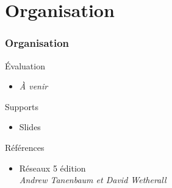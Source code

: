 \section{Organisation}

\begin{frame}[fragile]
  \frametitle{Organisation}
Évaluation
\begin{itemize}
	\item \textit{À venir}
\end{itemize}

Supports
\begin{itemize}
	\item Slides
\end{itemize}

Références
	\begin{itemize}
		\item Réseaux 5\raisebox{5pt}{\scriptsize e} édition \\ 
		\textit{Andrew Tanenbaum et David Wetherall}
	\end{itemize}
\end{frame}

